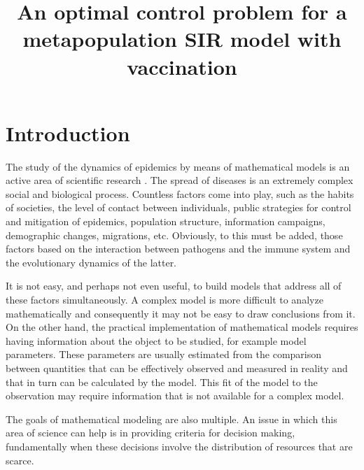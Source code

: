 \documentclass[a4paper,10pt]{article}
\title{An optimal control problem for a metapopulation SIR model with vaccination}
\author{}
\theoremstyle{remark}
\begin{document}
\maketitle

\begin{abstract}

\end{abstract}


\section{Introduction}


The study of the dynamics of epidemics by means of mathematical models is an active area of scientific research \cite{LindaS.Allen486,FredBrauer478,FredBrauer479,MaiaMartcheva480,FredBrauer482}. The spread of diseases is an extremely complex social and biological process. Countless factors come into play, such as the habits of societies, the level of contact between individuals, public strategies for control and mitigation of epidemics, population structure, information campaigns, demographic changes, migrations, etc. Obviously, to this must be added,   those factors based on the interaction between pathogens and the immune system and the evolutionary dynamics of the latter.

It is not easy, and perhaps not even useful, to build models that address all of these factors simultaneously. A complex model is more difficult to analyze mathematically and consequently it may not be easy to draw conclusions from it. On the other hand, the practical implementation of mathematical models requires having information about the object to be studied, for example model parameters. These parameters are usually estimated from the comparison between quantities that can be effectively observed and measured in reality and that in turn can be calculated by the model. This fit of the model to the observation may require information that is not available for a complex model.

The goals of mathematical modeling are also multiple. An issue in which this area of science can help is in providing criteria for decision making, fundamentally when these decisions involve the distribution of resources that are scarce. 

\end{document}
